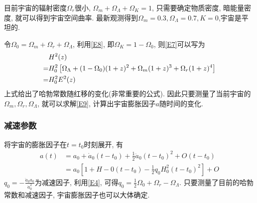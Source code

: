 目前宇宙的辐射密度$\Omega_r$很小, $ \Omega_m + \Omega_{\Lambda} + \Omega_K = 1 $, 只需要确定物质密度, 暗能量密度, 就可以得到宇宙空间曲率. 最新观测得到$\Omega_m = 0.3, \Omega_{\Lambda} =0.7,  K=0$,宇宙是平坦的. 

令$\Omega_0=\Omega_m+\Omega_r+\Omega_\Lambda$, 利用\ref{E8}, 即$\Omega_K=1-\Omega_0$, 则\ref{E7}可以写为
\begin{align}
    &H^2(z) \notag\\
    =&H_0^2\left[ \Omega_\Lambda+(1-\Omega_0)(1+z)^2+\Omega_m(1+z)^3+\Omega_r(1+z)^4 \right] \notag\\
    =&H_0^2E^2(z) \label{E9}
\end{align}
上式给出了哈勃常数随红移的变化(非常重要的公式). 因此只要测量了当前宇宙的$\Omega_m, \Omega_r, \Omega_\Lambda$, 就可以求解\ref{E9}, 计算出宇宙膨胀因子$a$随时间的变化. 

\subsubsection{减速参数}
将宇宙的膨胀因子在$t=t_0$时刻展开, 有
\begin{align*}
    a(t)&=a_0+\dot{a}_0 (t-t_0)+\frac{1}{2}\ddot{a}_0 (t-t_0)^2+O(t-t_0)\\
    &=a_0\left[ 1+H-0 (t-t_0)-\frac{1}{2}q_0 H_0^2(t-t_0)^2\right]+O
\end{align*}
$q_0=-\frac{\ddot{a}_0 a_0}{\dot{a}_0 ^2}$为减速因子, 利用\ref{E4}, 可得$q_0=\frac{1}{2}\Omega_0+\Omega_r-\Omega_\Lambda$. 只要测量了目前的哈勃常数和减速因子, 宇宙膨胀因子也可以大体确定. 

